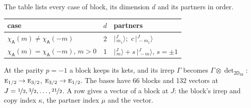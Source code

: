 \documentclass[10pt,a4paper]{article}
\numberwithin{equation}{section}
\newcommand{\grp}[1]{\mathsf{#1}}
\newcommand{\irr}[1]{\text{\normalfont\scshape #1}}
\newcommand{\chiA}{\chi_{\grp{A}}}
\newcommand{\irrprod}{\otimes}
\newcommand{\mult}{\kappa}
\newcommand{\intx}{\mu}
\newcommand{\jm}[2]{\bigl\lvert{}^{#1}_{\,#2}\bigr\rangle}
\begin{document}
\leavevmode\label{n:head.case}\label{n:head.partners}The table lists every case of block, its dimension $d$ and its partners in order.
\begin{center}\begin{tabular}{@{}lrl@{}}\toprule
case & $d$ & partners\\\midrule
$\chiA(m) \ne \chiA(-m)$ & 2 & $\jm{J}{m_1}$;\ $c\,\jm{J}{-m_1}$\\
$\chiA(m) = \chiA(-m)$, $m > 0$ & 1 & $\jm{J}{m} + s\,\jm{J}{-m}$, $s = \pm1$\\
\bottomrule\end{tabular}\end{center}
At the parity $p = -1$ a block keeps its kets, and its irrep $\Gamma$ becomes $\Gamma \irrprod \det_{\grp{2D_{2d}}}$: $\irr{e}_{1/2} \to \irr{e}_{3/2}$, $\irr{e}_{3/2} \to \irr{e}_{1/2}$.
The bases have 66 blocks and 132 vectors at $J = \nicefrac{1}{2}, \nicefrac{3}{2}, \dots, \nicefrac{21}{2}$. \label{n:head.vector}A row gives a vector of a block at $J$: the block's irrep and copy index $\mult$, the partner index $\intx$ and the vector.
\end{document}
